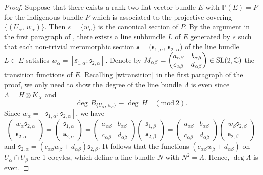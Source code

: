 \documentclass[12pt]{article}
\begin{document}
\begin{proof}
Suppose that there exists a rank two flat vector bundle $E$ with ${\mathbb P}(E)=P$ for the indigenous bundle $P$ which is associated to the projective covering $\{(U_\alpha,\,w_\alpha)\}$. Then $s = \{w_\alpha\}$ is the canonical section of $P$. By the argument in the first paragraph of \cite[Section 4]{Atiyah57II}, there exists a line subbundle $L$ of $E$ generated by $s$ such that each non-trivial meromorphic section ${\mathfrak s}=\big({\mathfrak s}_{1,\alpha},\,{\mathfrak s}_{2,\,\alpha}\big)$ of the line bundle $L\subset E$ satisfies $w_\alpha=[{\mathfrak s}_{1,\alpha} : {\mathfrak s}_{2,\alpha}]$. Denote by
$ M_{\alpha\beta} = \begin{pmatrix}
   a_{\alpha\beta} & b_{\alpha\beta} \\
   c_{\alpha\beta} & d_{\alpha\beta}
\end{pmatrix} \in {\rm SL(2, \mathbb{C})}$
the transition functions of $E$. Recalling \eqref{wtransition} in the first paragraph of the proof, we only need to show the degree of the line bundle $\Lambda$ is even since $\Lambda = H \otimes K_X$ and
\[ \deg\, B_{\{U_\alpha,\,w_\alpha\}}\equiv \deg\, H\quad (\text{mod}\ 2).\]
Since
$w_\alpha = [{\mathfrak s}_{1,\alpha} :{\mathfrak s}_{2,\alpha}]$, we have
\[ \begin{pmatrix}
  w_{\alpha}{\mathfrak s}_{2,\alpha} \\
  {\mathfrak s}_{2,\alpha}
\end{pmatrix} = \begin{pmatrix}
  {\mathfrak s}_{1,\alpha} \\
  {\mathfrak s}_{2,\alpha}
\end{pmatrix} = \begin{pmatrix}
  a_{\alpha\beta} & b_{\alpha\beta} \\
  c_{\alpha\beta} & d_{\alpha\beta}
\end{pmatrix} \begin{pmatrix}
 {\mathfrak s}_{1,\beta} \\
  {\mathfrak s}_{2,\beta}
\end{pmatrix} = \begin{pmatrix}
  a_{\alpha\beta} & b_{\alpha\beta} \\
  c_{\alpha\beta} & d_{\alpha\beta}
\end{pmatrix} \begin{pmatrix}
  w_{\beta}{\mathfrak s}_{2,\beta} \\
  {\mathfrak s}_{2,\beta}
\end{pmatrix} \]
and ${\mathfrak s}_{2, \alpha} = (c_{\alpha\beta}w_{\beta} + d_{\alpha\beta}) {\mathfrak s}_{2,\beta}$. It follows that the functions $\left(c_{\alpha\beta}w_{\beta} + d_{\alpha\beta}\right)$ on $U_{\alpha} \cap U_{\beta}$ are 1-cocyles, which define a line bundle $N$ with $N^2 = \Lambda$. Hence, $\deg \Lambda$ is even.
\end{proof}
\end{document}
